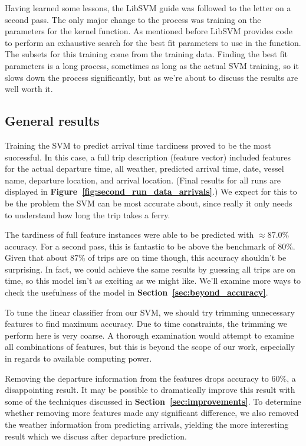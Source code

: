 \documentclass[11pt]{article} %
\begin{document}
Having learned some lessons, the LibSVM guide was followed to the letter on a 
second pass. The only major change to the process was training on the 
parameters for the kernel function. As mentioned before LibSVM provides code
to perform an exhaustive search for the best fit parameters to use in the function.
The subsets for this training come from the training data. Finding the best fit 
parameters is a long process, sometimes as long as the actual SVM training, so it
slows down the process significantly, but as we're about to discuss the results
are well worth it.

\subsection{General results}
\label{sec:gen_results}
Training the SVM to predict arrival time tardiness proved to be the most successful.
In this case, a full trip description (feature vector) included features for the 
actual departure 
time, all weather, predicted arrival time, date, vessel name, departure location, 
and arrival location. (Final results for all runs are displayed in 
\textbf{Figure~\ref{fig:second_run_data_arrivals}}.) We expect for this to 
be the problem the SVM can be most accurate about, since really it only needs to 
understand how long the trip takes a ferry. 

The tardiness of full feature instances were able to be predicted with 
$\approx 87.0\%$ accuracy. For a second pass, this is fantastic to be above the
benchmark of $80\%$. Given that about $87\%$ of trips are on time though, this 
accuracy shouldn't be surprising. In fact, we could achieve the same results 
by guessing all trips are on time, so this model isn't as exciting as we might
like. We'll examine more ways to check the usefulness of the model in 
\textbf{Section~\ref{sec:beyond_accuracy}}. 

To tune the linear classifier from our SVM, we should
try trimming unnecessary features to find maximum accuracy. Due to time 
constraints, the trimming we perform here is very coarse. A thorough examination
would attempt to examine all combinations of features, but this is beyond the
scope of our work, especially in regards to available computing power.

Removing the departure information from the features drops accuracy to $60\%$, 
a disappointing result. It may be possible to dramatically improve this result with
some of the techniques discussed in \textbf{Section~\ref{sec:improvements}}.
To determine whether removing more features made any significant difference, we
also removed the weather information from predicting arrivals, yielding 
the more interesting result which we discuss after departure prediction.
\end{document}
